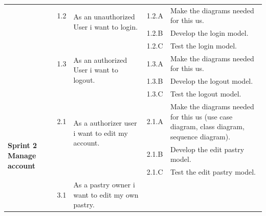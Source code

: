 \documentclass[12pt,a4paper]{report}
\begin{document}
	\begin{table}[H]
	\begin{center}
		\setlength\doublerulesep{0.5pt}
		\begin{tabular}{|  p{3cm}|  p{1cm}| p{4cm}|  p{1cm}| p{6cm}|}
			 \cline{2-5}  
			
			&                       
			1.2  &  
			\multirow{2}{4cm}{As an unauthorized User i want to login.}
			
			&				                      
			1.2.A &                        
				Make the diagrams needed for this \ac{us}.
			\\ 
			\cline{4-5}    
			&                   
			&                                 
			&                        
			1.2.B &                        
			Develop the login model.
				\\ 
			\cline{4-5}    
			&                   
			&                                 
			&                        
			1.2.C &                        
			Test the login model.
			\\
			\cline{2-5}  
			
			&                       
			1.3  &  
			\multirow{2}{4cm}{As an 
				authorized User i want to logout.}
			
			&				                      
			1.3.A &                        
			Make the diagrams needed for this \ac{us}.
			\\ 
			\cline{4-5}    
			&                   
			&                                 
			&                        
			1.3.B &                        
			Develop the logout model.
			\\ 
			\cline{4-5}    
			&                   
			&                                 
			&                        
			1.3.C &                        
			Test the logout model.
			\\ \hline
			\multirow{5}{3cm}{\textbf{Sprint 2} \textbf{Manage account} }
			&                       
			2.1  &  
			\multirow{2}{4cm}{As a authorizer user i want to edit my account.}
			
			&				                      
			2.1.A &                        
			Make the diagrams needed for this \ac{us} (use case diagram, class diagram, sequence diagram).
			\\ 
			\cline{4-5}    
			&                   
			&                                 
			&                        
			2.1.B &                        
			Develop the edit pastry model.
			\\ 
			\cline{4-5}    
			&                   
			&                                 
			&                        
			2.1.C &                        
			Test the edit pastry model.
			\\ \hline
			\multirow{5}{3cm}{\textbf{Sprint 3} \textbf{Manage pastries} }
			&                       
			3.1  &  
			\multirow{2}{4cm}{As a pastry owner i want to edit my own pastry.}
			

\end{tabular}
\end{center}
\end{table}
\end{document}
